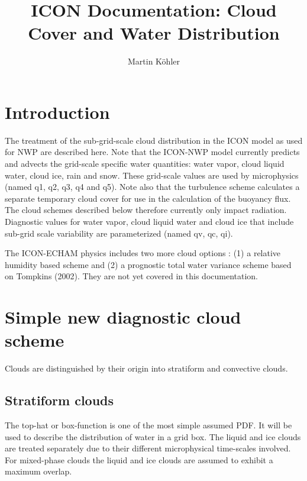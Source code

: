 \documentclass[a4paper,11pt]{article}
\author{Martin K\"{o}hler}
\title{ICON Documentation: Cloud Cover and Water Distribution}
\begin{document}
  \maketitle


\section{Introduction}

The treatment of the sub-grid-scale cloud distribution 
in the ICON model as used for NWP are described here.  Note that the ICON-NWP
model currently predicts and advects the grid-scale specific water quantities: 
water vapor, cloud liquid water, cloud ice, rain and snow.  These grid-scale
values are used by microphysics (named q1, q2, q3, q4 and q5).  
Note also that the turbulence scheme 
calculates a separate temporary cloud
cover for use in the calculation of the buoyancy flux.
The cloud schemes described below therefore currently only impact radiation.
Diagnostic values for water vapor, cloud liquid water and cloud ice that include
sub-grid scale variability are parameterized (named qv, qc, qi).

The ICON-ECHAM physics includes two more cloud options : 
(1) a relative humidity based scheme and (2) a prognostic
total water variance scheme based on Tompkins (2002). 
They are not yet covered 
in this documentation.



\section{Simple new diagnostic cloud scheme}
\label{sc:diag}

Clouds are distinguished by their origin into stratiform and convective clouds.

\subsection{Stratiform clouds}

The top-hat or box-function is one of the most simple assumed PDF.  It will be 
used to describe the distribution of water in a grid box.  The liquid and ice 
clouds are treated separately due to their different microphysical time-scales 
involved.  For mixed-phase clouds the liquid and ice clouds are assumed to exhibit
a maximum overlap.
\end{document}
